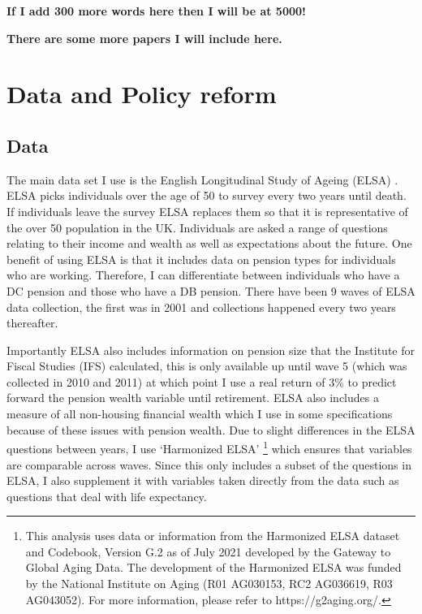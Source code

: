 \documentclass[12pt]{article}
\begin{document}
\textbf{If I add 300 more words here then I will be at 5000!}

\textbf{There are some more papers I will include here.}

\section{Data and Policy reform}

\subsection{Data}

The main data set I use is the English Longitudinal Study of Ageing (ELSA) \cite{main_elsa_citation}. ELSA picks individuals
over the age of 50 to survey every two years until death. If individuals leave the survey ELSA replaces them so that it is
representative of the over 50 population in the UK. Individuals are asked a range of questions relating to their income
and wealth as well as expectations about the future. One benefit of using ELSA is that it includes data on pension types
for individuals who are working. Therefore, I can differentiate between individuals who have a DC pension and those who have a DB pension.
There have been 9 waves of ELSA data collection, the first was in 2001 and collections happened every two years thereafter.

Importantly ELSA also includes information on pension size that the Institute for Fiscal Studies (IFS) calculated, this is only available
up until wave 5 (which was collected in 2010 and 2011) at which point I use a real return
of 3\% to predict forward the pension wealth variable until retirement. ELSA also includes a measure of all
non-housing financial wealth which I use in some specifications because of these issues with
pension wealth. Due to slight differences in the ELSA questions between years, I use `Harmonized ELSA'
\footnote{This analysis uses data or information from the Harmonized ELSA dataset and Codebook, Version G.2 as of
    July 2021 developed by the Gateway to Global Aging Data. The development of the Harmonized ELSA was funded by the National
    Institute on Aging (R01 AG030153, RC2 AG036619, R03 AG043052). For more information,
    please refer to https://g2aging.org/.} which ensures that variables are comparable across waves. Since this only includes a
subset of the questions in ELSA, I also supplement it with variables taken directly from the data such as questions that deal
with life expectancy.
\end{document}
